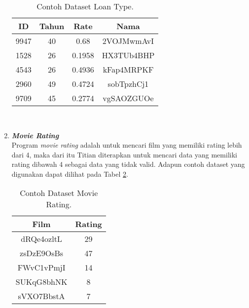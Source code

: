 \begin{enumerate}
            \begin{longtable}{|c|c|c|c|}
                  \caption{Contoh Dataset Loan Type.}
                  \label{tb:loantypedataset} \\
                  \hline
                  \rowcolor[HTML]{C0C0C0}
                  \textbf{ID} & \textbf{Tahun} & \textbf{Rate} & \textbf{Nama} \\
                  \hline
                  9947 & 40 & 0.68 & 2VOJMwmAvI \\
                  1528 & 26 & 0.1958 & HX3TUb4BHP \\
                  4543 & 26 & 0.4936 & kFap4MRPKF \\
                  2960 & 49 & 0.4724 & sobTpzhCj1 \\
                  9709 & 45 & 0.2774 & vgSAOZGUOe \\
                  \hline
            \end{longtable}

      \

      \item \emph{\textbf{Movie Rating}} \\
            Program \emph{movie rating} adalah untuk mencari film yang memiliki rating lebih dari 4, maka dari itu Titian diterapkan untuk mencari data yang memiliki rating dibawah 4 sebagai data yang tidak valid.
            Adapun contoh dataset yang digunakan dapat 
            dilihat pada Tabel \ref{tb:movieratingdataset}.

            \begin{longtable}{|c|c|}
                  \caption{Contoh Dataset Movie Rating.}
                  \label{tb:movieratingdataset} \\
                  \hline
                  \rowcolor[HTML]{C0C0C0}
                  \textbf{Film} & \textbf{Rating} \\
                  \hline
                  dRQe4ozltL & 29 \\
                  zsDzE9OsBs & 47 \\
                  FWvC1vPmjI & 14 \\
                  SUKqG8bhNK & 8 \\
                  sVXO7BbstA & 7 \\
                  \hline
            \end{longtable}


\end{enumerate}
